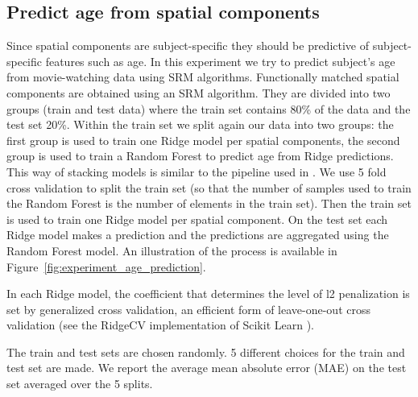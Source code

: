 \subsection{Predict age from spatial components}
Since spatial components are subject-specific they should be predictive of subject-specific features such as age.
%
In this experiment we try to predict subject's age from movie-watching data using SRM algorithms.
%
Functionally matched spatial components are obtained using an SRM algorithm.
%
They are divided into two groups (train and test data) where the train set contains 80\% of the data and the test set 20\%.
%
Within the train set we split again our data into two groups: the first group is used to train one Ridge model per spatial components, the second group is used to train a Random Forest to predict age from Ridge predictions. This way of stacking models is similar to the pipeline used in \cite{rahim2017joint}.
%
We use 5 fold cross validation to split the train set (so that the number of samples used to train the Random Forest is the number of elements in the train set).
%
Then the train set is used to train one Ridge model per spatial component.
%
On the test set each Ridge model makes a prediction and the predictions are aggregated using the Random Forest model.
%
An illustration of the process is available in Figure~\ref{fig:experiment_age_prediction}. 

In each Ridge model, the coefficient that determines the level of l2 penalization is set by generalized cross validation, an efficient form of leave-one-out cross validation (see the RidgeCV implementation of Scikit Learn \cite{pedregosa2011scikit}).

The train and test sets are chosen randomly. 5 different choices for the train and test set are made. We report the average mean absolute error (MAE) on the test set averaged over the 5 splits.

